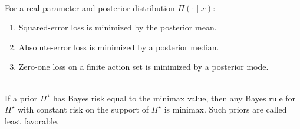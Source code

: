 \begin{example} \label{ex:posterior-mean-median-mode-loss} \\
For a real parameter and posterior distribution $\Pi(\cdot\mid x)$:
\begin{enumerate}[label=(\roman*)]
\setlength{\itemsep}{0pt}
\item Squared-error loss is minimized by the posterior mean.
\item Absolute-error loss is minimized by a posterior median.
\item Zero-one loss on a finite action set is minimized by a posterior mode.
\end{enumerate}
\end{example}

\begin{remark} \label{rem:minimax-bayes-least-favorable} \\
If a prior $\Pi^\star$ has Bayes risk equal to the minimax value, then any Bayes rule for $\Pi^\star$ with constant risk on the support of $\Pi^\star$ is minimax.  Such priors are called least favorable.
\end{remark}
